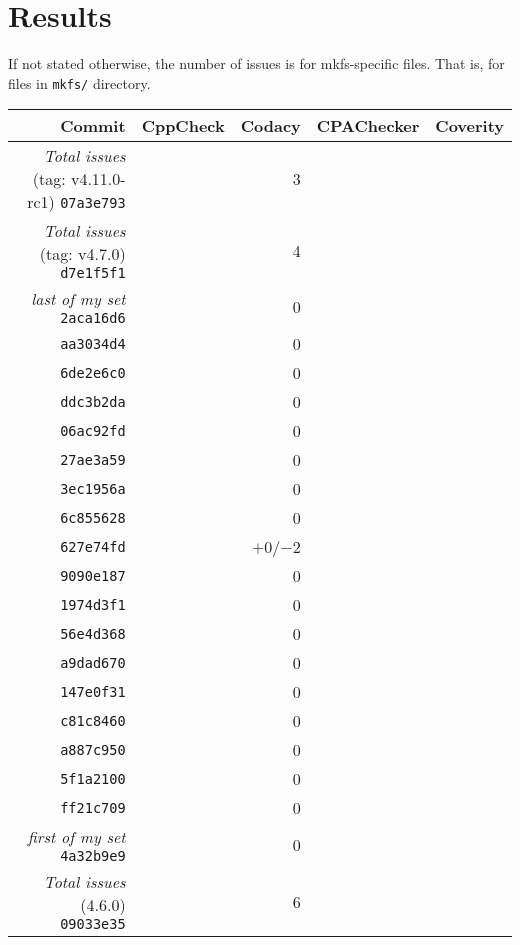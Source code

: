 
\chapter{Results}\label{chap:results}

If not stated otherwise, the number of issues is for mkfs-specific files.
That is, for files in {\tt mkfs/} directory.

\begin{table}[h]
\begin{tabular}{|r||r|r|r|r|}
\hline
Commit & CppCheck & Codacy & CPAChecker & Coverity \\
\hline
\hline
{\em Total issues} (tag: v4.11.0-rc1) {\tt 07a3e793} & & 3 & & \\
\hline
{\em Total issues} (tag: v4.7.0) {\tt d7e1f5f1} & & 4 & & \\
\hline
{\em last of my set} {\tt 2aca16d6} & & 0 & & \\
\hline
{\tt aa3034d4} & & 0 & & \\
\hline
{\tt 6de2e6c0} & & 0 & & \\
\hline
{\tt ddc3b2da} & & 0 & & \\
\hline
{\tt 06ac92fd} & & 0 & & \\
\hline
{\tt 27ae3a59} & & 0 & & \\
\hline
{\tt 3ec1956a} & & 0 & & \\
\hline
{\tt 6c855628} & & 0 & & \\
\hline
{\tt 627e74fd} & & $+0$/$-2$ & & \\
\hline
{\tt 9090e187} & & 0 & & \\
\hline
{\tt 1974d3f1} & & 0 & & \\
\hline
{\tt 56e4d368} & & 0 & & \\
\hline
{\tt a9dad670} & & 0 & & \\
\hline
{\tt 147e0f31} & & 0 & & \\
\hline
{\tt c81c8460} & & 0 & & \\
\hline
{\tt a887c950} & & 0 & & \\
\hline
{\tt 5f1a2100} & & 0 & & \\
\hline
{\tt ff21c709} & & 0 & & \\
\hline
{\em first of my set} {\tt 4a32b9e9} & & 0 & & \\
\hline
{\em Total issues} (4.6.0) {\tt 09033e35} & & 6 & & \\

\end{tabular}
\end{table}
